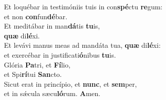 \evenverse Et loquébar in testimóniis tuis in con\textbf{spé}ctu \textbf{re}gum:~\*\\
\evenverse et non \textbf{con}fun\textbf{dé}bar.\\
\oddverse Et meditábar in man\textbf{dá}tis \textbf{tu}is,~\*\\
\oddverse \textbf{quæ} di\textbf{lé}xi.\\
\evenverse Et levávi manus meas ad mandáta tua, \textbf{quæ} di\textbf{lé}xi:~\*\\
\evenverse et exercébar in justificati\textbf{ó}nibus \textbf{tu}is.\\
\oddverse Glória \textbf{Pa}tri, et \textbf{Fí}lio,~\*\\
\oddverse et Spi\textbf{rí}tui \textbf{San}cto.\\
\evenverse Sicut erat in princípio, et \textbf{nunc}, et \textbf{sem}per,~\*\\
\evenverse et in sǽcula sæcu\textbf{ló}rum. \textbf{A}men.\\
